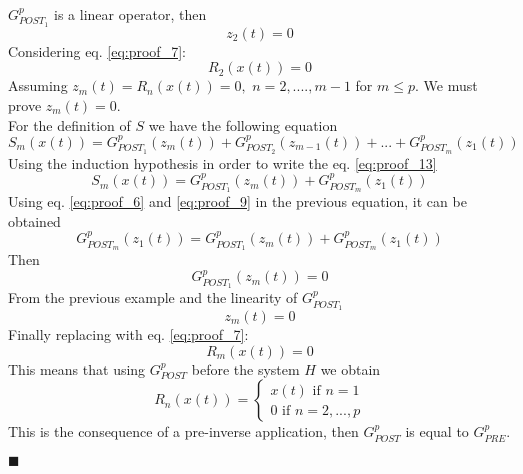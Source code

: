 $G_{POST_1}^p$ is a linear operator, then
\begin{equation}
z_2(t) = 0
\label{eq:proof_12}
\end{equation}
Considering eq. \ref{eq:proof_7}:
\begin{equation}
R_2(x(t))=0
\end{equation}
Assuming $z_m (t) = R_n (x(t)) = 0,$ $n=2,....,m-1$ for $m\leq p$. We must prove $z_m(t) = 0$.\\
For the definition of $S$ we have the following equation
\begin{equation}
S_m(x(t)) = G_{POST_1}^p(z_m(t)) + G_{POST_2}^p (z_{m-1} (t)) + ... + G_{POST_m}^p (z_1 (t))
\label{eq:proof_13}
\end{equation} 
Using the induction hypothesis in order to write the eq. \ref{eq:proof_13}
\begin{equation}
S_m (x(t)) = G_{POST_1}^p (z_m (t)) + G_{POST_m}^p (z_1(t))
\end{equation}
Using eq. \ref{eq:proof_6} and \ref{eq:proof_9} in the previous equation, it can be obtained
\[ G_{POST_m}^p (z_1(t)) = G_{POST_1}^p (z_m (t)) + G_{POST_m}^p (z_1 (t))  \]
Then
\begin{equation}
G_{POST_1}^p ( z_m (t)) = 0
\end{equation} 
From the previous example and the linearity of $G_{POST_1}^p$
\begin{equation}
z_m(t) = 0
\end{equation}
Finally replacing with eq. \ref{eq:proof_7}:
\begin{equation}
R_m(x(t))=0
\end{equation}
This means that using $G_{POST}^p$ before the system $H$ we obtain
\begin{equation}
R_n (x(t)) = \begin{cases}
               x(t) \text{     if } n=1\\
               0 \text {         if } n=2,...,p
            \end{cases}
\label{eq: proof_end}
\end{equation}
This is the consequence of a pre-inverse application, then $G_{POST}^p$ is equal to $G_{PRE}^p$.
\begin{flushright}
$\blacksquare$
\end{flushright}

